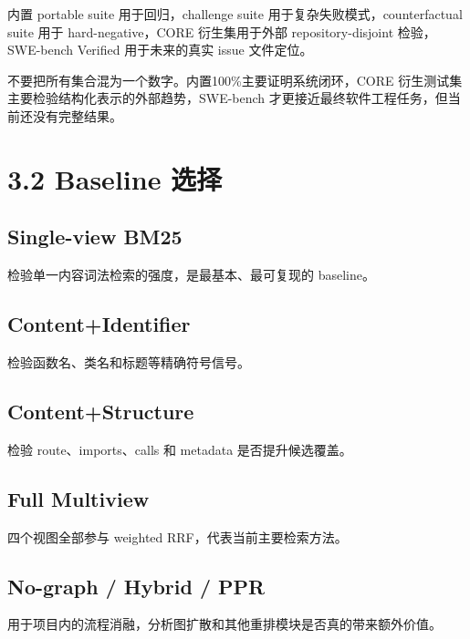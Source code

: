 \documentclass[UTF8,12pt,openany]{ctexbook}
\begin{document}
内置 portable suite 用于回归，challenge suite 用于复杂失败模式，counterfactual suite 用于 hard-negative，CORE 衍生集用于外部 repository-disjoint 检验，SWE-bench Verified 用于未来的真实 issue 文件定位。\par

不要把所有集合混为一个数字。内置100\%主要证明系统闭环，CORE 衍生测试集主要检验结构化表示的外部趋势，SWE-bench 才更接近最终软件工程任务，但当前还没有完整结果。\par

\section{3.2 Baseline 选择}

\subsection{Single-view BM25}

检验单一内容词法检索的强度，是最基本、最可复现的 baseline。\par

\subsection{Content+Identifier}

检验函数名、类名和标题等精确符号信号。\par

\subsection{Content+Structure}

检验 route、imports、calls 和 metadata 是否提升候选覆盖。\par

\subsection{Full Multiview}

四个视图全部参与 weighted RRF，代表当前主要检索方法。\par

\subsection{No-graph / Hybrid / PPR}

用于项目内的流程消融，分析图扩散和其他重排模块是否真的带来额外价值。\par
\end{document}
